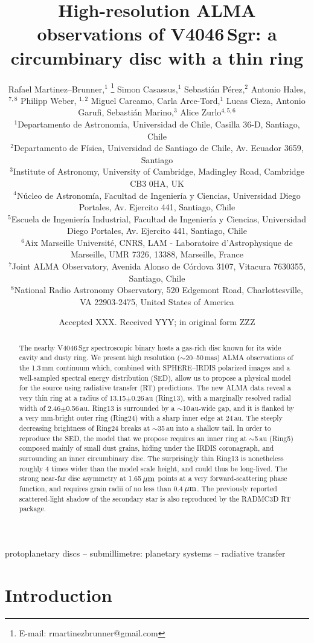 \documentclass[usenatbib,times]{mnras}
\title[High-resolution ALMA observations of V4046\,Sgr]{High-resolution ALMA observations of V4046\,Sgr: a circumbinary disc with a thin ring}
\author[R. Martinez Brunner et al.]{Rafael Martinez--Brunner,$^{1}$
\thanks{E-mail: rmartinezbrunner@gmail.com}
Simon Casassus,$^{1}$
Sebasti\'an P\'erez,$^{2}$
Antonio Hales,$^{7,8}$
Philipp Weber, $^{1,2}$ \newauthor
Miguel Carcamo,
Carla Arce-Tord,$^{1}$
Lucas Cieza,
Antonio Garufi,
Sebasti\'an Marino,$^{3}$
Alice Zurlo$^{4,5,6}$
\\
$^{1}$Departamento de Astronom\'ia, Universidad de Chile, Casilla 36-D, Santiago, Chile\\
$^{2}$Departamento de F\'isica, Universidad de Santiago de Chile, Av. Ecuador 3659, Santiago\\
$^{3}$Institute of Astronomy, University of Cambridge, Madingley Road, Cambridge CB3 0HA, UK\\
$^{4}$N\'ucleo de Astronom\'ia, Facultad de Ingenier\'ia y Ciencias, Universidad Diego Portales, Av. Ejercito 441, Santiago, Chile\\
$^{5}$Escuela de Ingenier\'ia Industrial, Facultad de Ingenier\'ia y Ciencias, Universidad Diego Portales, Av. Ejercito 441, Santiago, Chile \\
$^{6}$Aix Marseille Universit\'e, CNRS, LAM - Laboratoire d'Astrophysique de Marseille, UMR 7326, 13388, Marseille, France  \\
$^{7}$Joint ALMA Observatory, Avenida Alonso de C\'ordova 3107, Vitacura 7630355, Santiago, Chile \\
$^{8}$National Radio Astronomy Observatory, 520 Edgemont Road, Charlottesville, VA 22903-2475, United States of America \\
}
\date{Accepted XXX. Received YYY; in original form ZZZ}
\begin{document}
\label{firstpage}
\pagerange{\pageref{firstpage}--\pageref{lastpage}}
\maketitle

\begin{abstract}
    The nearby V4046\,Sgr spectroscopic binary hosts a gas-rich disc known for its wide cavity and dusty ring.  We present high resolution ($\sim$20--50\,mas) ALMA observations of the 1.3\,mm  continuum which, combined with SPHERE--IRDIS polarized images and a well-sampled spectral energy distribution (SED), allow us to propose a physical model for the source using radiative transfer (RT) predictions. The new ALMA data reveal a very thin ring at a radius of 13.15$\pm$0.26\,au (Ring13), with a marginally resolved radial width of 2.46$\pm$0.56\,au. Ring13 is surrounded by a $\sim$10\,au-wide gap, and it is flanked by a very mm-bright outer ring (Ring24) with a sharp inner edge at 24\,au. The steeply decreasing brightness of Ring24 breaks at $\sim$35\,au into a shallow tail. In order to reproduce the SED, the model that we propose requires an inner ring at $\sim$5\,au (Ring5) composed mainly of small dust grains, hiding under the IRDIS coronagraph, and surrounding an inner circumbinary disc. The surprisingly thin Ring13 is nonetheless roughly 4 times wider than the model scale height, and could thus be long-lived. The strong near-far disc asymmetry at 1.65\,$\hbox{$\mu$m}$ points at a very forward-scattering phase function, and requires grain radii of no less than 0.4\,$\hbox{$\mu$m}$. The previously reported scattered-light shadow of the secondary star is also reproduced by the RADMC3D RT package. 
\end{abstract}

\begin{keywords}
 protoplanetary discs -- submillimetre: planetary systems -- radiative transfer
\end{keywords}



\section{Introduction} \label{sec:Introduction}
\end{document}
